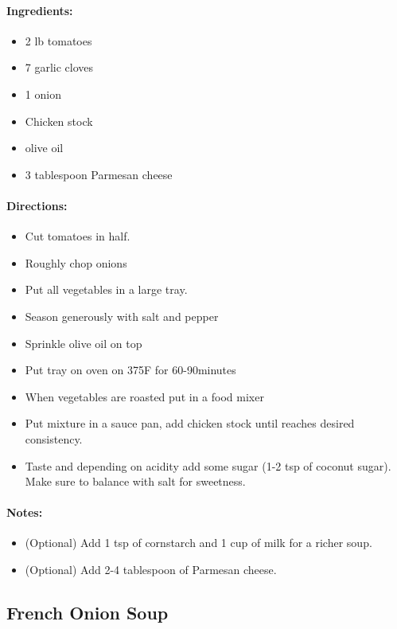 \documentclass{article}
\begin{document}
\paragraph{Ingredients:}
\begin{itemize}
    \item 2 lb tomatoes
    \item 7 garlic cloves
    \item 1 onion
    \item Chicken stock
    \item olive oil
    \item 3 tablespoon Parmesan cheese
\end{itemize}

\paragraph{Directions:}
\begin{itemize}
    \item Cut tomatoes in half.
    \item Roughly chop onions
    \item Put all vegetables in a large tray.
    \item Season generously with salt and pepper
    \item Sprinkle olive oil on top
    \item Put tray on oven on 375F for 60-90minutes
    \item When vegetables are roasted put in a food mixer
    \item Put mixture in a sauce pan, add chicken stock until reaches desired consistency.
    \item Taste and depending on acidity add some sugar (1-2 tsp of coconut sugar). Make sure to balance with salt for sweetness.
\end{itemize}

\paragraph{Notes:}
\begin{itemize}
    \item (Optional) Add 1 tsp of cornstarch and 1 cup of milk for a richer soup.
    \item (Optional) Add 2-4 tablespoon of Parmesan cheese.
\end{itemize}

\subsection{French Onion Soup}
\end{document}
